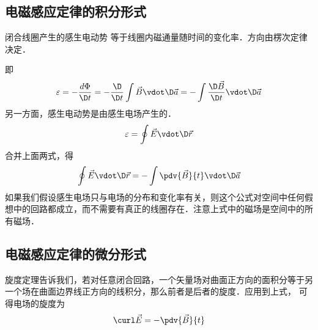 

\subsection{电磁感应定律的积分形式}

闭合线圈产生的感生电动势%
等于线圈内磁通量随时间的变化率．方向由楞次定律%
决定．

即
\begin{equation}
\varepsilon  =  - \frac{{d\Phi }}{{\D t}} =  - \frac{\D }{{\D t}}\int {\vec B \vdot \D \vec a}  =  - \int {\frac{{\D \vec B}}{{\D t}} \vdot \D \vec a} 
\end{equation} 
另一方面，感生电动势是由感生电场产生的． 
\begin{equation}
\varepsilon  = \oint {\vec E \vdot \D \vec r} 
\end{equation} 
合并上面两式，得
\begin{equation}
\oint {\vec E \vdot \D \vec r}  =  - \int {\pdv{\vec B}{t} \vdot \D \vec a} 
\end{equation} 
如果我们假设感生电场只与电场的分布和变化率有关，则这个公式对空间中任何假想中的回路都成立，而不需要有真正的线圈存在．注意上式中的磁场是空间中的所有磁场． 
\subsection{电磁感应定律的微分形式}

旋度定理告诉我们，若对任意闭合回路，一个矢量场对曲面正方向的面积分等于另一个场在曲面边界线正方向的线积分，那么前者是后者的旋度．应用到上式， 可得电场的旋度为
\begin{equation}
\curl \vec E =  - \pdv{\vec B}{t}
\end{equation} 

